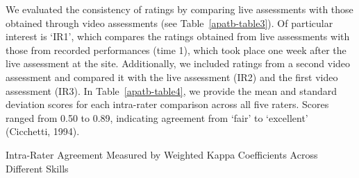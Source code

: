\documentclass[
  man,
  colorlinks=true,linkcolor=blue,citecolor=blue,urlcolor=blue]{apa7}
\begin{document}
We evaluated the consistency of ratings by comparing live assessments
with those obtained through video assessments (see
Table~\ref{apatb-table3}). Of particular interest is `IR1', which
compares the ratings obtained from live assessments with those from
recorded performances (time 1), which took place one week after the live
assessment at the site. Additionally, we included ratings from a second
video assessment and compared it with the live assessment (IR2) and the
first video assessment (IR3). In Table~\ref{apatb-table4}, we provide
the mean and standard deviation scores for each intra-rater comparison
across all five raters. Scores ranged from 0.50 to 0.89, indicating
agreement from `fair' to `excellent' (Cicchetti, 1994).

\newpage{}

\begin{table}
\caption{Intra-Rater Agreement Measured by Weighted Kappa Coefficients Across Different Skills}
\label{apatb-table3}


\end{table}
\end{document}
